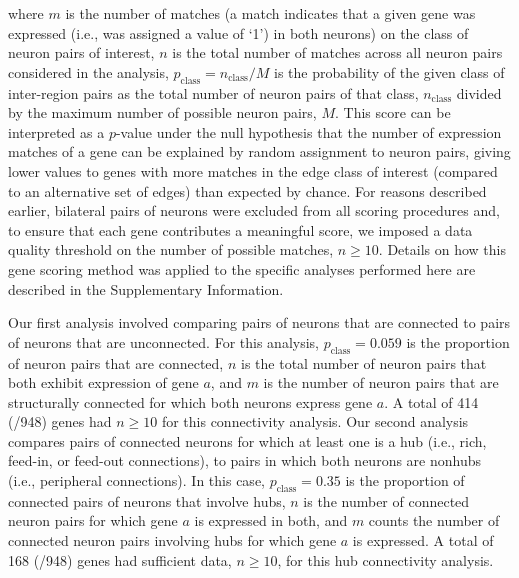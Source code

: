 \documentclass[10pt,letterpaper]{article}
\begin{document}
where $m$ is the number of matches (a match indicates that a given gene was expressed (i.e., was assigned a value of `1') in both neurons) on the class of neuron pairs of interest, $n$ is the total number of matches across all neuron pairs considered in the analysis, $p_\mathrm{class} = n_\mathrm{class}/M$ is the probability of the given class of inter-region pairs as the total number of neuron pairs of that class, $n_\mathrm{class}$ divided by the maximum number of possible neuron pairs, $M$.
This score can be interpreted as a $p$-value under the null hypothesis that the number of expression matches of a gene can be explained by random assignment to neuron pairs, giving lower values to genes with more matches in the edge class of interest (compared to an alternative set of edges) than expected by chance.
For reasons described earlier, bilateral pairs of neurons were excluded from all scoring procedures and, to ensure that each gene contributes a meaningful score, we imposed a data quality threshold on the number of possible matches, $n \geq 10$.
Details on how this gene scoring method was applied to the specific analyses performed here are described in the Supplementary Information.

Our first analysis involved comparing pairs of neurons that are connected to pairs of neurons that are unconnected.
For this analysis, $p_\mathrm{class} = 0.059$ is the proportion of neuron pairs that are connected, $n$ is the total number of neuron pairs that both exhibit expression of gene $a$, and $m$ is the number of neuron pairs that are structurally connected for which both neurons express gene $a$.
A total of 414 (/948) genes had $n \geq 10$ for this connectivity analysis.
Our second analysis compares pairs of connected neurons for which at least one is a hub (i.e., rich, feed-in, or feed-out connections), to pairs in which both neurons are nonhubs (i.e., peripheral connections).
In this case, $p_\mathrm{class} = 0.35$ is the proportion of connected pairs of neurons that involve hubs, $n$ is the number of connected neuron pairs for which gene $a$ is expressed in both, and $m$ counts the number of connected neuron pairs involving hubs for which gene $a$ is expressed.
A total of 168 (/948) genes had sufficient data, $n \geq 10$, for this hub connectivity analysis.
\end{document}
